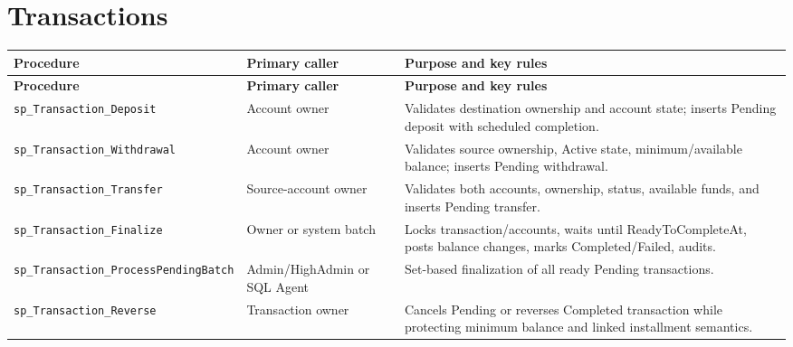 \documentclass[11pt,a4paper,oneside]{report}
\begin{document}
\section{Transactions}
\begingroup
\footnotesize
\setlength{\tabcolsep}{4pt}
\renewcommand{\arraystretch}{1.08}
\begin{longtable}{L{0.30\textwidth}L{0.22\textwidth}L{0.41\textwidth}}
\toprule\textbf{Procedure} & \textbf{Primary caller} & \textbf{Purpose and key rules}\\\midrule\endfirsthead
\toprule\textbf{Procedure} & \textbf{Primary caller} & \textbf{Purpose and key rules}\\\midrule\endhead
\nolinkurl{sp_Transaction_Deposit} & Account owner & Validates destination ownership and account state; inserts Pending deposit with scheduled completion.\\
\nolinkurl{sp_Transaction_Withdrawal} & Account owner & Validates source ownership, Active state, minimum\slash available balance; inserts Pending withdrawal.\\
\nolinkurl{sp_Transaction_Transfer} & Source-account owner & Validates both accounts, ownership, status, available funds, and inserts Pending transfer.\\
\nolinkurl{sp_Transaction_Finalize} & Owner or system batch & Locks transaction\slash accounts, waits until ReadyToCompleteAt, posts balance changes, marks Completed\slash Failed, audits.\\
\nolinkurl{sp_Transaction_ProcessPendingBatch} & Admin\slash HighAdmin or SQL Agent & Set-based finalization of all ready Pending transactions.\\
\nolinkurl{sp_Transaction_Reverse} & Transaction owner & Cancels Pending or reverses Completed transaction while protecting minimum balance and linked installment semantics.\\
\bottomrule
\end{longtable}
\endgroup
\end{document}
